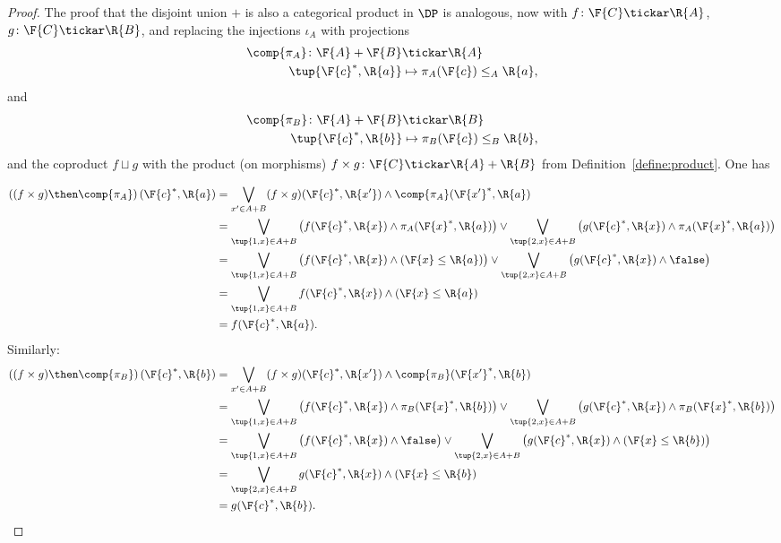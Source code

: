 \begin{proof}
The proof that the disjoint union $+$ is also a categorical product in $\DP$ is analogous, now with $f \colon \F{C} \tickar \R{A}$, $g \colon \F{C} \tickar \R{B}$, and replacing the injections $\iota_A$ with projections
\begin{equation}
    \begin{aligned}
    \comp{\pi_A} \colon \F{A}+\F{B} &\tickar \R{A}\\
    \tup{\F{c}^*,\R{a}}&\mapsto \pi_A(\F{c})\leq_A \R{a},
    \end{aligned}
\end{equation}
and
\begin{equation}
    \begin{aligned}
    \comp{\pi_B} \colon \F{A}+\F{B} &\tickar \R{B}\\
    \tup{\F{c}^*,\R{b}}&\mapsto \pi_B(\F{c})\leq_B \R{b},
    \end{aligned}
\end{equation}
and the coproduct $f \sqcup g$ with the product (on morphisms) $f \times g \colon \F{C} \tickar \R{A} + \R{B}$ from Definition~\ref{define:product}. One has

\begin{equation}
    \begin{aligned}
    \left((f\times g)\then \comp{\pi_A}\right)(\F{c}^*,\R{a})&=\bigvee_{x'\in A+B} (f\times g)(\F{c}^*,\R{x'}) \wedge \comp{\pi_A}(\F{x'}^*,\R{a})\\
    &=\bigvee_{\tup{1,x}\in A+B}\left( f(\F{c}^*,\R{x}) \wedge \pi_A(\F{x}^*,\R{a})\right) \vee 
    \bigvee_{\tup{2,x}\in A+B}\left( g(\F{c}^*,\R{x}) \wedge \pi_A(\F{x}^*,\R{a})\right)\\
    &=\bigvee_{\tup{1,x}\in A+B}\left( f(\F{c}^*,\R{x}) \wedge (\F{x}\leq \R{a})\right) \vee 
    \bigvee_{\tup{2,x}\in A+B}\left( g(\F{c}^*,\R{x}) \wedge \false \right)\\
    &=\bigvee_{\tup{1,x}\in A+B} f(\F{c}^*,\R{x}) \wedge (\F{x}\leq \R{a})\\
    &=f(\F{c}^*,\R{a}).
    \end{aligned}
\end{equation}
Similarly:
\begin{equation}
    \begin{aligned}
    \left((f\times g)\then \comp{\pi_B}\right)(\F{c}^*,\R{b})&=\bigvee_{x'\in A+B} (f\times g)(\F{c}^*,\R{x'}) \wedge \comp{\pi_B}(\F{x'}^*,\R{b})\\
    &=\bigvee_{\tup{1,x}\in A+B}\left( f(\F{c}^*,\R{x}) \wedge \pi_B(\F{x}^*,\R{b})\right) \vee 
    \bigvee_{\tup{2,x}\in A+B}\left( g(\F{c}^*,\R{x}) \wedge \pi_B(\F{x}^*,\R{b})\right)\\
    &=\bigvee_{\tup{1,x}\in A+B}\left( f(\F{c}^*,\R{x}) \wedge \false \right) \vee 
    \bigvee_{\tup{2,x}\in A+B}\left( g(\F{c}^*,\R{x}) \wedge (\F{x}\leq \R{b}) \right)\\
    &=\bigvee_{\tup{2,x}\in A+B} g(\F{c}^*,\R{x}) \wedge (\F{x}\leq \R{b}) \\
    &=g(\F{c}^*,\R{b}).
    \end{aligned}
\end{equation}
\end{proof}

